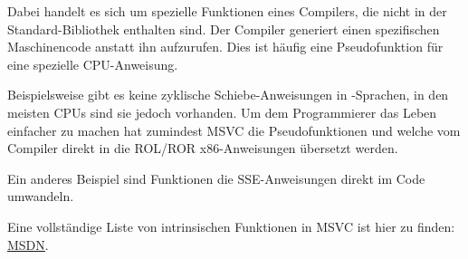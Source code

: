 \label{sec:compiler_intrinsic}


Dabei handelt es sich um spezielle Funktionen eines Compilers, die nicht in der
Standard-Bibliothek enthalten sind.
Der Compiler generiert einen spezifischen Maschinencode anstatt ihn aufzurufen.
Dies ist häufig eine Pseudofunktion für eine spezielle \ac{CPU}-Anweisung.

Beispielsweise gibt es keine zyklische Schiebe-Anweisungen in \CCpp -Sprachen,
in den meisten \ac{CPU}s sind sie jedoch vorhanden.
Um dem Programmierer das Leben einfacher zu machen hat zumindest MSVC die
Pseudofunktionen  und \FNMSDNROTxURL{} welche vom
Compiler direkt in die ROL/ROR x86-Anweisungen übersetzt werden.

Ein anderes Beispiel sind Funktionen die SSE-Anweisungen direkt im Code umwandeln.

Eine vollständige Liste von intrinsischen Funktionen in MSVC ist hier zu finden:
\href{http://go.yurichev.com/17254}{MSDN}.
